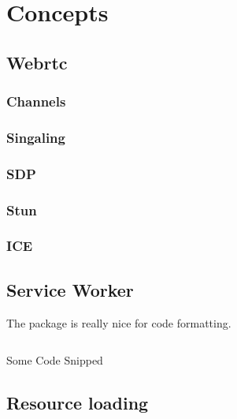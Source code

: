 \chapter{Concepts}\label{ch:concept}


\section{Webrtc}
\subsection{Channels}
\subsection{Singaling}
\subsection{SDP}
\subsection{Stun}
\subsection{ICE}

\section{Service Worker}

The  package is really nice for code formatting.

\begin{listing}[h]
	\inputminted{ruby}{listings/context-data-transform.rb}
	\caption{Some Code Snipped}
	\label{lst:code-snipped}
\end{listing}

\section{Resource loading}
